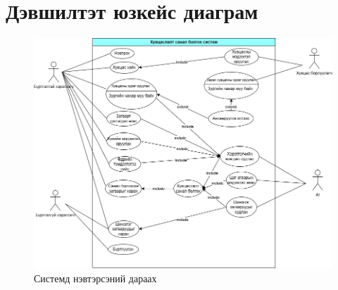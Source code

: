 \section{Дэвшилтэт юзкейс диаграм}
\begin{figure}[H]
    \centering
    \caption{Системд нэвтэрсэний дараах }
    \includegraphics[width=\textwidth]{figures/shaardlagalab7.drawio (1).png}
    
    \label{fig:sudalgaa}
\end{figure}
